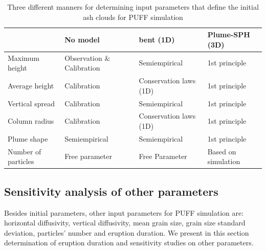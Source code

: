 \begin{table}[htp]
\centering
      \caption{Three different manners for determining input parameters that define the initial ash clouds for PUFF simulation}		
	  \begin{tabular}{p{31mm}p{32mm}p{32mm}p{32mm}}
	    \hline
	    		 & No model & bent (1D) & Plume-SPH \newline (3D) \\
	    		 \hline    		 
	  Maximum height & Observation $\&$ \newline Calibration & Semiempirical &  1st principle \\
	  Average height &  Calibration & Conservation \newline laws (1D) &  1st principle  \\
	  Vertical spread &  Calibration & Semiempirical & 1st principle \\
	  Column radius & Calibration  &  Conservation \newline laws (1D) &  1st principle \\
	  Plume shape & Semiempirical & Semiempirical  & 1st principle \\
	  Number of \newline particles & Free \newline parameter  & Free \newline Parameter & Based on \newline simulation\\ 
	    \hline
	  \end{tabular}
	  \label{tab:VATDs-source-term-determination}
\end{table}

\subsection{Sensitivity analysis of other parameters}

Besides initial parameters, other input parameters for PUFF simulation are: horizontal diffusivity, vertical diffusivity, mean grain size, grain size standard deviation, particles' number and eruption duration. We present in this section determination of eruption duration and sensitivity studies on other parameters.

